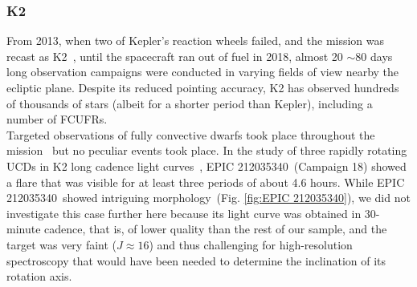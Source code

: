 \documentclass[fleqn,usenatbib,letters]{mnras}%
\newcommand{\FD}{EPIC 212035340} %
\begin{document}
\subsubsection{K2}
\label{sec:photometryK2}
From 2013, when two of Kepler's reaction wheels failed, and the mission was recast as K2~\citep{howell2014}, until the spacecraft ran out of fuel in 2018, almost 20 $\sim$80
days long observation campaigns were conducted in varying fields of view nearby the ecliptic plane. Despite its reduced pointing accuracy, K2 has observed hundreds of thousands of stars (albeit for a shorter period than Kepler), including a number of FCUFRs.
\\
Targeted observations of fully convective dwarfs took place throughout the mission~\citep{gizis2017, gizis2017b, paudel2018} but no peculiar events took place.
In the study of three rapidly rotating UCDs in K2 long cadence light curves~\citep{paudel2019}, %
\FD~(Campaign 18) showed a flare that was visible for at least three periods of about 4.6 hours.
While
\FD~showed intriguing morphology~(Fig. \ref{fig:\FD}), we did not investigate this case further here because its light curve was obtained in 30-minute cadence, that is, of lower quality than the rest of our sample, and the target was very faint ($J\approx 16$) and thus challenging for high-resolution spectroscopy that would have been needed to determine the inclination of its rotation axis.
\end{document}
